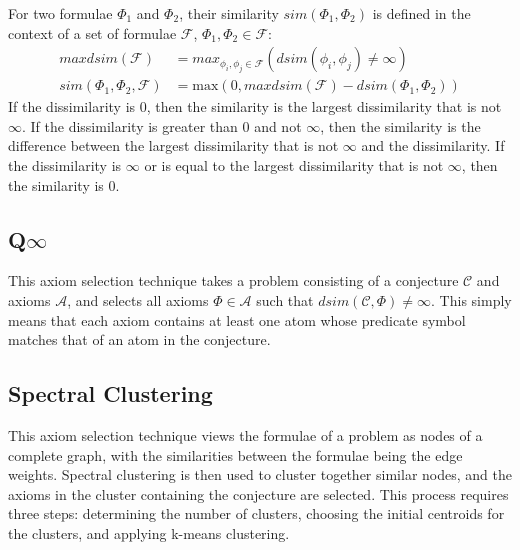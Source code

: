 \documentclass[EPiC]{easychair}
\begin{document}
For two formulae $\Phi_1$ and $\Phi_2$, their similarity $sim(\Phi_1,\Phi_2)$
is defined in the context of a set of formulae $\mathcal{F}$, 
$\Phi_1,\Phi_2 \in \mathcal{F}$:
\begin{align}
maxdsim(\mathcal{F}) &= max_{\phi_i,\phi_j \in \mathcal{F}} (dsim(\phi_i,\phi_j) \neq \infty) \\
sim(\Phi_1,\Phi_2,\mathcal{F}) &= \textrm{max}(0, maxdsim(\mathcal{F}) - dsim(\Phi_1,\Phi_2))
\end{align}
If the dissimilarity is $0$, then the similarity is the largest dissimilarity 
that is not $\infty$.
If the dissimilarity is greater than $0$ and not $\infty$, then the similarity 
is the difference between the largest dissimilarity that is not $\infty$ and 
the dissimilarity.
If the dissimilarity is $\infty$ or is equal to the largest 
dissimilarity that is not $\infty$, then the similarity is $0$.

\subsection{Q$\infty$}
\label{QinghuaInf}

This axiom selection technique takes a problem consisting of a conjecture 
$\mathcal{C}$ and axioms $\mathcal{A}$, and selects all axioms 
$\Phi \in \mathcal{A}$ such that $dsim(\mathcal{C},\Phi) \neq \infty$.
This simply means that each axiom contains at least one atom whose predicate
symbol matches that of an atom in the conjecture.

% 
\subsection{Spectral Clustering}
\label{Zishi}

This axiom selection technique views the formulae of a problem as nodes
of a complete graph, with the similarities between the formulae being the 
edge weights.
Spectral clustering \cite{vLu07} is then used to cluster together similar 
nodes, and the axioms in the cluster containing the conjecture are selected.
This process requires three steps:
determining the number of clusters,
choosing the initial centroids for the clusters,
and
applying k-means clustering.
\end{document}
